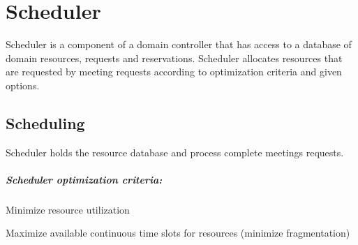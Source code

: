 \chapter{Scheduler}

Scheduler is a component of a domain controller that has access to a database 
of domain resources, requests and reservations. Scheduler allocates resources 
that are requested by meeting requests according to optimization criteria and 
given options.

\section{Scheduling}

Scheduler holds the resource database and process complete meetings requests. 



\paragraph{Scheduler optimization criteria:}
\begin{compactitem}
\item Minimize resource utilization
\item Maximize available continuous time slots for resources (minimize 
  fragmentation)
\end{compactitem}

